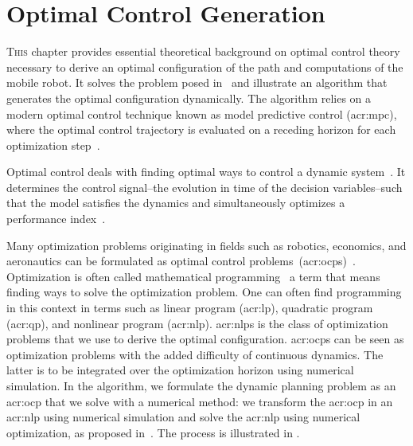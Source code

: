 
\chapter{Optimal Control Generation}
\label{cp:opt}


\lettrine{T}{his} chapter provides essential theoretical background on optimal control theory necessary to derive an optimal configuration of the path and computations of the mobile robot. It solves the problem posed in~ and illustrate an algorithm that generates the optimal configuration dynamically. The algorithm relies on a modern optimal control technique known as model predictive control (\Gls{acr:mpc}), where the optimal control trajectory is evaluated on a receding horizon for each optimization step~\citep{rawlings2017model}. 

Optimal control deals with finding optimal ways to control a dynamic system~\citep{sethi2019optimal}. It determines the control signal--the evolution in time of the decision variables--such that the model satisfies the dynamics and simultaneously optimizes a performance index~\citep{kirk2004optimal}.

Many optimization problems originating in fields such as robotics, economics, and aeronautics can be formulated as optimal control problems~(\Gls{acr:ocp}s)~\citep{von1992direct}. Optimization is often called mathematical programming~\citep{nocedal2006numerical} a term that means finding ways to solve the optimization problem. One can often find programming in this context in terms such as linear program (\Gls{acr:lp}), quadratic program (\Gls{acr:qp}), and nonlinear program (\Gls{acr:nlp}). \Gls{acr:nlp}s is the class of optimization problems that we use to derive the optimal configuration. \Gls{acr:ocp}s can be seen as optimization problems with the added difficulty of continuous dynamics. The latter is to be integrated over the optimization horizon using numerical simulation. In the algorithm, we formulate the dynamic planning problem as an \Gls{acr:ocp} that we solve with a numerical method: we transform the \Gls{acr:ocp} in an \Gls{acr:nlp} using numerical simulation and solve the \Gls{acr:nlp} using numerical optimization, as proposed in~\citep{rawlings2017model}. The process is illustrated in .

